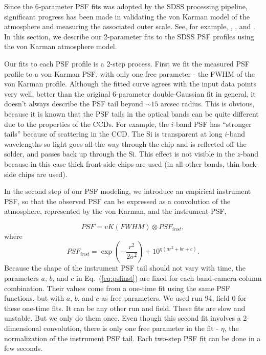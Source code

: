 

Since the 6-parameter PSF fits was adopted by the SDSS processing
pipeline, significant progress has been made in validating the von
Karman model of the atmosphere and measuring the associated outer
scale. See, for example, \cite{Tokovinin2002},
\cite{Boccas2004}, and \cite{MartinezMessenger}.
In this section, we describe our 2-parameter fits to the SDSS PSF
profiles using the von Karman atmosphere model.

Our fits to each PSF profile is a 2-step process. First we fit the
measured PSF profile to a von Karman PSF, with only one free parameter -
the FWHM of the von Karman profile. Although the fitted
curve agrees with the input data points very well, better than the
original 6-parameter double-Gaussian fit in general, it doesn't always describe
the PSF tail beyond $\sim 15$ arcsec radius. This is obvious, because
it is known that the PSF tails in the optical bands can be quite
different due to the properties of the CCDs.
For example, the $i$-band PSF has ``stronger tails''
because of scattering in the CCD.  The Si is transparent at long $i$-band wavelengths 
so light goes all the way through the chip and is reflected off the solder, and passes 
back up through the Si. This effect is not visible in the $z$-band because in this case
thick front-side chips are used (in all other bands, thin back-side chips are used). 

In the second step of our PSF modeling, we introduce an
empirical instrument PSF, so that the observed PSF can be expressed as
a convolution of the atmosphere, represented by the von Karman, and
the instrument PSF,

\begin{equation}
        PSF = vK (FWHM) \otimes PSF_{inst},
\end{equation} 
where
\begin{equation}
        PSF_{inst} = \exp(-\frac{r^2}{2\sigma^2}) + 10^{\eta(ar^2+br+c)}.
\label{eq:psfinst}
\end{equation} 
Because the shape of the instrument PSF tail should not vary with
time, the parameters $a$, $b$, and $c$ in Eq.~(\ref{eq:psfinst}) are
fixed for each band-camera-column combination.
Their values come from a one-time fit using the same PSF functions,
but with $a$, $b$, and $c$ as free parameters.
We used run 94, field 0 for these one-time fits. It can be any other
run and field.
These fits are slow and unstable. But we only do them once.
Even though this second fit involves a 2-dimensional convolution,
there is only one free parameter in the fit - 
$\eta$, the normalization of the instrument PSF tail.
Each two-step PSF fit can be done in a few seconds.


